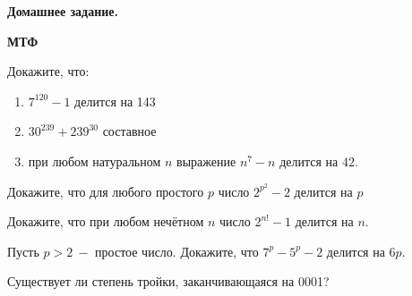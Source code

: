 \centerline{\bf \Huge Домашнее задание.}
\centerline{\bf \Huge МТФ}

\begin{flushright}
        \scriptsize{}
\end{flushright}

Докажите, что:
\begin{enumerate}
    \item $7^{120} - 1$ делится на 143
    \item $30^{239} + 239^{30}$ составное
    \item при любом натуральном $n$ выражение $n^{7} - n$ делится на $42$.
\end{enumerate}

 Докажите, что для любого простого $p$ число $2^{p^2} - 2 $ делится на $p$

Докажите, что при любом нечётном $n$ число  $2^{n!} - 1$  делится на $n$.

Пусть $p > 2 \ -$ простое число. Докажите, что $7^p - 5^p - 2$ делится на $6p$.

Существует ли степень тройки, заканчивающаяся на 0001?